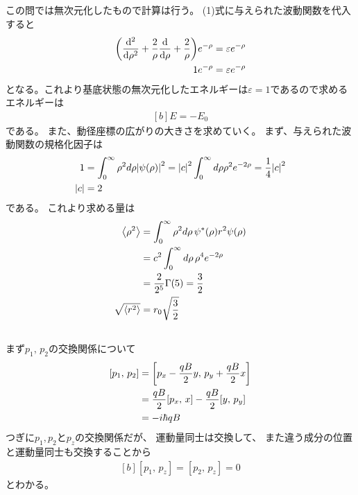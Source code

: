 \documentclass[../../master.tex]{subfiles}
\begin{document}
\subsection{}
この問では無次元化したもので計算は行う。
(1)式に与えられた波動関数を代入すると
\begin{equation}\begin{aligned}[b]
    \qty(\dv[2]{\rho}+\frac{2}{\rho}\dv{\rho}+\frac{2}{\rho})e^{-\rho} &= \varepsilon e^{-\rho}\\
    1e^{-\rho} &= \varepsilon e^{-\rho}
\end{aligned}\end{equation}
となる。これより基底状態の無次元化したエネルギーは\(\varepsilon = 1\)であるので求めるエネルギーは
\begin{equation}\begin{aligned}[b]
    E = -E_0
\end{aligned}\end{equation}
である。
また、動径座標の広がりの大きさを求めていく。
まず、与えられた波動関数の規格化因子は
\begin{equation}\begin{aligned}[b]
    1 &= \int_{0}^{\infty} \rho^2 d\rho \abs{\psi(\rho)}^2
        = \abs{c}^2\int_{0}^{\infty} d\rho \rho^2 e^{-2\rho} = \frac{1}{4}\abs{c}^2\\
    \abs{c} &= 2
\end{aligned}\end{equation}
である。
これより求める量は
\begin{equation}\begin{aligned}[b]
    \ev{\rho^2}
    &= \int_{0}^{\infty} \rho^2 d\rho\, \psi^*(\rho)r^2\psi(\rho)\\
    &= c^2 \int_{0}^{\infty} d\rho\, \rho^4 e^{-2\rho}\\
    &= \frac{2}{2^5}\Gamma(5) = \frac{3}{2}\\
    \sqrt{\ev{r^2}} &= r_0\sqrt{\frac{3}{2}}
\end{aligned}\end{equation}

\subsection{}
まず\(p_1,\,p_2\)の交換関係について
\begin{equation}\begin{aligned}[b]
    [p_1,\,p_2]&= \qty[p_x-\frac{qB}{2}y,\,p_y+\frac{qB}{2}x]\\
    &=\frac{qB}{2}[p_x,\,x]-\frac{qB}{2}[y,\,p_y]\\
    &= -i\hbar qB
\end{aligned}\end{equation}
つぎに\(p_1,p_2\)と\(p_z\)の交換関係だが、
運動量同士は交換して、
また違う成分の位置と運動量同士も交換することから
\begin{equation}\begin{aligned}[b]
    [p_1,\,p_z] = [p_2,\,p_z] = 0
\end{aligned}\end{equation}
とわかる。
\end{document}
